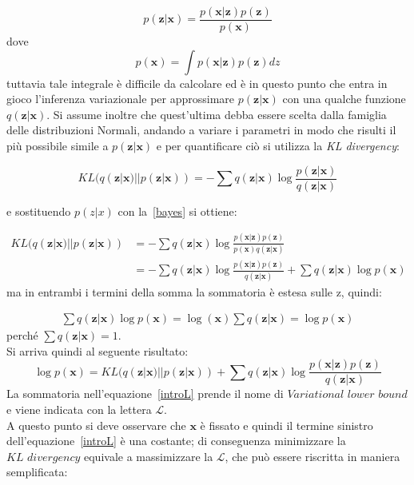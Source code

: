 \begin{equation}
	p(\textbf{z}|\textbf{x}) = \frac{p(\textbf{x}|\textbf{z}) p(\textbf{z})}{p(\textbf{x})}
	\label{bayes}
\end{equation}
dove
\begin{equation}
	p(\textbf{x}) = \int p(\textbf{x}|\textbf{z}) p(\textbf{z}) dz
	\label{integrale}
\end{equation}
tuttavia tale integrale è difficile da calcolare ed è in questo punto che entra in gioco l'inferenza variazionale per approssimare $p(\textbf{z}|\textbf{x})$ con una qualche funzione $q(\textbf{z}|\textbf{x})$. Si assume inoltre che quest'ultima debba essere scelta dalla famiglia delle distribuzioni Normali, andando a variare i parametri in modo che risulti il più possibile simile a $p(\textbf{z}|\textbf{x})$ e per quantificare ciò si utilizza la
\textit{KL divergency}: 

\begin{equation}
	KL (q(\textbf{z}|\textbf{x}) || p(\textbf{z}|\textbf{x})) = -\sum q(\textbf{z}|\textbf{x}) \log \frac{p(\textbf{z}|\textbf{x})}{q(\textbf{z}|\textbf{x})}
\end{equation}

e sostituendo $p(z|x)$ con la~\ref{bayes} si ottiene:


\begin{align*} 
	KL (q(\textbf{z}|\textbf{x}) || p(\textbf{z}|\textbf{x})) &=  -\sum q(\textbf{z}|\textbf{x}) \log \frac{p(\textbf{x}|\textbf{z})p(\textbf{z})}{p(\textbf{x})q(\textbf{z}|\textbf{x})} \\ &=  -\sum q(\textbf{z}|\textbf{x})\log \frac{p(\textbf{x}|\textbf{z})p(\textbf{z})}{q(\textbf{z}|\textbf{x})} + \sum q(\textbf{z}|\textbf{x})\log p(\textbf{x})
\end{align*}
ma in entrambi i termini della somma la sommatoria è estesa sulle z, quindi:

\begin{align*}
	\sum q(\textbf{z}|\textbf{x})\log p(\textbf{x}) =
	\log (\textbf{x}) \sum q(\textbf{z}|\textbf{x}) =
	\log p(\textbf{x})
\end{align*}
perché $\sum q(\textbf{z}|\textbf{x})=1$. \\
Si arriva quindi al seguente risultato:
\begin{equation}
	\log p(\textbf{x}) = KL (q(\textbf{z}|\textbf{x}) || p(\textbf{z}|\textbf{x})) + \sum q(\textbf{z}|\textbf{x}) \log \frac{p(\textbf{x}|\textbf{z})p(\textbf{z})}{q(\textbf{z}|\textbf{x})}
	\label{introL}
\end{equation}
La sommatoria nell'equazione~\ref{introL} prende il nome di $\textit{Variational lower bound}$ e viene indicata con la lettera $\mathcal{L}$. \\
A questo punto si deve osservare che $\textbf{x}$ è fissato e quindi il termine sinistro dell'equazione~\ref{introL} è una costante; di conseguenza minimizzare la $\textit{KL divergency}$ equivale a massimizzare la $\mathcal{L}$, che può essere riscritta in maniera semplificata:

